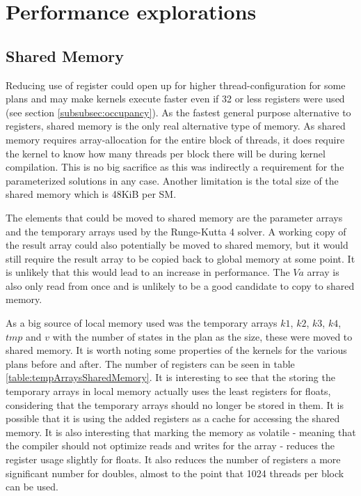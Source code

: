 \section{Performance explorations}
\subsection{Shared Memory}
Reducing use of register could open up for higher thread-configuration for some plans and may make kernels execute faster even if 32 or less registers were used (see section \ref{subsubsec:occupancy}).
As the fastest general purpose alternative to registers, shared memory is the only real alternative type of memory.
As shared memory requires array-allocation for the entire block of threads, it does require the kernel to know how many threads per block there will be during kernel compilation.
This is no big sacrifice as this was indirectly a requirement for the parameterized solutions in any case.
Another limitation is the total size of the shared memory which is 48KiB per SM.

The elements that could be moved to shared memory are the parameter arrays and the temporary arrays used by the Runge-Kutta 4 solver.
A working copy of the result array could also potentially be moved to shared memory, but it would still require the result array to be copied back to global memory at some point.
It is unlikely that this would lead to an increase in performance.
The $Va$ array is also only read from once and is unlikely to be a good candidate to copy to shared memory.

As a big source of local memory used was the temporary arrays $k1$, $k2$, $k3$, $k4$, $tmp$ and $v$ with the number of states in the plan as the size, these were moved to shared memory.
It is worth noting some properties of the kernels for the various plans before and after.
The number of registers can be seen in table \ref{table:tempArraysSharedMemory}.
It is interesting to see that the storing the temporary arrays in local memory actually uses the least registers for floats, considering that the temporary arrays should no longer be stored in them.
It is possible that it is using the added registers as a cache for accessing the shared memory.
It is also interesting that marking the memory as volatile - meaning that the compiler should not optimize reads and writes for the array - reduces the register usage slightly for floats.
It also reduces the number of registers a more significant number for doubles, almost to the point that 1024 threads per block can be used.

